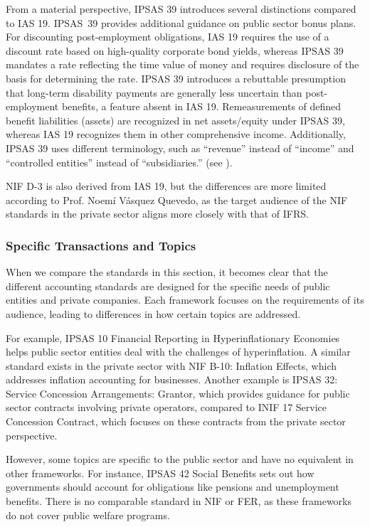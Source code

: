 \documentclass[10pt]{article}
\begin{document}
From a material perspective, IPSAS 39 introduces several distinctions compared to IAS 19. IPSAS~39 provides additional guidance on public sector bonus plans. For discounting post-employment obligations, IAS 19 requires the use of a discount rate based on high-quality corporate bond yields, whereas IPSAS 39 mandates a rate reflecting the time value of money and requires disclosure of the basis for determining the rate. IPSAS 39 introduces a rebuttable presumption that long-term disability payments are generally less uncertain than post-employment benefits, a feature absent in IAS 19. Remeasurements of defined benefit liabilities (assets) are recognized in net assets/equity under IPSAS 39, whereas IAS 19 recognizes them in other comprehensive income. Additionally, IPSAS 39 uses different terminology, such as “{}revenue”{} instead of “{}income”{} and “{}controlled entities”{} instead of “{}subsidiaries.”{} (see \cite[p.~20]{Eurostat}).

NIF D-3 is also derived from IAS 19, but the differences are more limited according to Prof. Noemí Vásquez Quevedo, as the target audience of the NIF standards in the private sector aligns more closely with that of IFRS.

\subsubsection{Specific Transactions and Topics}\label{subsubsec:specific_transactions_and_topics}
When we compare the standards in this section, it becomes clear that the different accounting standards are designed for the specific needs of public entities and private companies. Each framework focuses on the requirements of its audience, leading to differences in how certain topics are addressed.

For example, IPSAS 10 Financial Reporting in Hyperinflationary Economies helps public sector entities deal with the challenges of hyperinflation. A similar standard exists in the private sector with NIF B-10: Inflation Effects, which addresses inflation accounting for businesses. Another example is IPSAS 32: Service Concession Arrangements: Grantor, which provides guidance for public sector contracts involving private operators, compared to INIF 17 Service Concession Contract, which focuses on these contracts from the private sector perspective.

However, some topics are specific to the public sector and have no equivalent in other frameworks. For instance, IPSAS 42 Social Benefits sets out how governments should account for obligations like pensions and unemployment benefits. There is no comparable standard in NIF or FER, as these frameworks do not cover public welfare programs.
\end{document}
